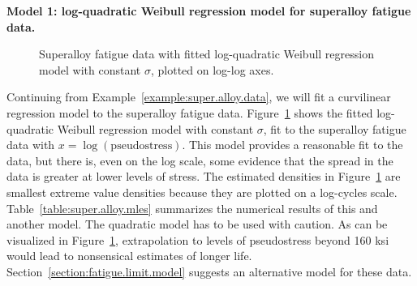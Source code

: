 \begin{example}
{\bf Model 1: log-quadratic Weibull
regression model for superalloy fatigue data.} 
\label{example:super.alloy.nf20}
\begin{figure}
\caption{Superalloy fatigue data with fitted 
log-quadratic Weibull regression model 
with constant $\sigma$, plotted on log-log axes.}
\label{figure:nf.altplot.nf20.weib.ps}
\end{figure}
Continuing from Example~\ref{example:super.alloy.data}, we will fit a
curvilinear regression model to the superalloy fatigue data.
Figure~\ref{figure:nf.altplot.nf20.weib.ps} shows the fitted
log-quadratic Weibull regression model with constant $\sigma$, fit to
the superalloy fatigue data with $x=\log(\mbox{pseudostress})$. This
model provides a reasonable fit to the data, but there is, even on the
log scale, some evidence that the spread in the data is greater at
lower levels of stress.  The estimated densities in
Figure~\ref{figure:nf.altplot.nf20.weib.ps} are smallest extreme value
densities because they are plotted on a log-cycles scale.
Table~\ref{table:super.alloy.mles} summarizes the numerical results of
this and another model.  The quadratic model has to be used with
caution.  As can be visualized in
Figure~\ref{figure:nf.altplot.nf20.weib.ps}, extrapolation to levels
of pseudostress beyond 160 ksi would lead to nonsensical estimates of
longer life.  Section~\ref{section:fatigue.limit.model}
suggests an alternative model for these data.
\end{example}

